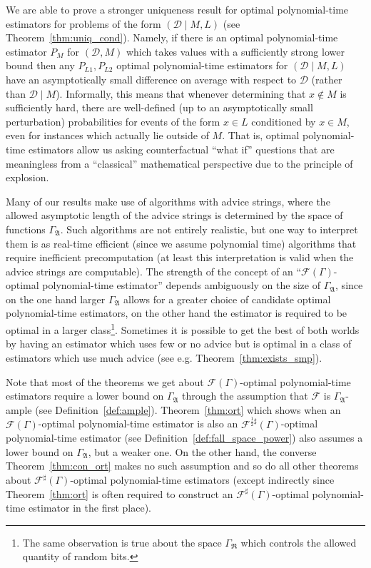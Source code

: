 \documentclass[11pt]{article}
\numberwithin{equation}{section}
\theoremstyle{definition}
\theoremstyle{plain}
\newcommand{\Dist}{\mathcal{D}}
\newcommand{\GrowR}{\Gamma_{\mathfrak{R}}}
\newcommand{\GrowA}{\Gamma_{\mathfrak{A}}}
\newcommand{\Fall}{\mathcal{F}}
\newcommand{\EG}{\Fall(\Gamma)}
\newcommand{\ESG}{\Fall^\sharp(\Gamma)}
\begin{document}
We are able to prove a stronger uniqueness result for optimal polynomial-time estimators for problems of the form ${(\Dist \mid M, L)}$ (see Theorem~\ref{thm:uniq_cond}). Namely, if there is an optimal polynomial-time estimator ${P_M}$ for ${(\Dist,M)}$ which takes values with a sufficiently strong lower bound then any ${P_{L1},P_{L2}}$ optimal polynomial-time estimators for ${(\Dist \mid M, L)}$ have an asymptotically small difference on average with respect to ${\Dist}$ (rather than ${\Dist \mid M}$). Informally, this means that whenever determining that ${x \not\in M}$ is sufficiently hard, there are well-defined (up to an asymptotically small perturbation) probabilities for events of the form ${x \in L}$ conditioned by ${x \in M}$, even for instances which actually lie outside of ${M}$. That is, optimal polynomial-time estimators allow us asking counterfactual \enquote{what if} questions that are meaningless from a \enquote{classical} mathematical perspective due to the principle of explosion.

Many of our results make use of algorithms with advice strings, where the allowed asymptotic length of the advice strings is determined by the space of functions ${\GrowA}$. Such algorithms are not entirely realistic, but one way to interpret them is as real-time efficient (since we assume polynomial time) algorithms that require inefficient precomputation (at least this interpretation is valid when the advice strings are computable). The strength of the concept of an \enquote{${\EG}$-optimal polynomial-time estimator} depends ambiguously on the size of ${\GrowA}$, since on the one hand larger ${\GrowA}$ allows for a greater choice of candidate optimal polynomial-time estimators, on the other hand the estimator is required to be optimal in a larger class\footnote{The same observation is true about the space ${\GrowR}$ which controls the allowed quantity of random bits.}. Sometimes it is possible to get the best of both worlds by having an estimator which uses few or no advice but is optimal in a class of estimators which use much advice (see e.g. Theorem~\ref{thm:exists_smp}).

Note that most of the theorems we get about ${\EG}$-optimal polynomial-time estimators require a lower bound on ${\GrowA}$ through the assumption that ${\Fall}$ is ${\GrowA}$-ample (see Definition~\ref{def:ample}). Theorem~\ref{thm:ort} which shows when an ${\EG}$-optimal polynomial-time estimator is also an ${\Fall^{\frac{1}{2}\sharp}(\Gamma)}$-optimal polynomial-time estimator (see Definition~\ref{def:fall_space_power}) also assumes a lower bound on ${\GrowA}$, but a weaker one. On the other hand, the converse Theorem~\ref{thm:con_ort} makes no such assumption and so do all other theorems about ${\ESG}$-optimal polynomial-time estimators (except indirectly since Theorem~\ref{thm:ort} is often required to construct an ${\ESG}$-optimal polynomial-time estimator in the first place).
\end{document}
